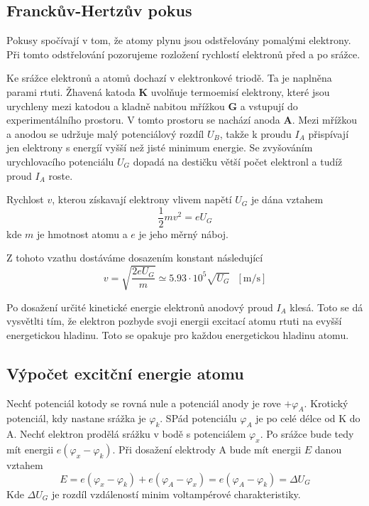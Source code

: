 \documentclass[titlepage]{article}
\begin{document}
\subsection{Franckův-Hertzův pokus}
Pokusy spočívají v tom, že atomy plynu jsou odstřelovány pomalými elektrony. Při tomto odstřelování pozorujeme rozložení rychlostí elektronů před a po srážce.

Ke srážce elektronů a atomů dochazí v elektronkové triodě. Ta je naplněna parami rtuti. Žhavená katoda \textbf{K} uvolňuje termoemisí elektrony, které jsou urychleny mezi katodou a kladně nabitou mřížkou \textbf{G} a vstupují do experimentálního prostoru. V tomto prostoru se nachází anoda \textbf{A}. Mezi mřížkou a anodou se udržuje malý potenciálový rozdíl $U_B$, takže k proudu $I_A$ přispívají jen elektrony s energíí vyšší než jisté minimum energie. Se zvyšováním urychlovacího potenciálu $U_G$ dopadá na destičku větší počet elektronl a tudíž proud $I_A$ roste.

Rychlost $v$, kterou získavají elektrony vlivem napětí $U_G$ je dána vztahem
\begin{equation}
 \frac{1}{2} m v^2 = e U_G
\end{equation}
kde $m$ je hmotnost atomu a $e$ je jeho měrný náboj.

Z tohoto vzathu dostáváme dosazením konstant následující
\begin{equation}
 v = \sqrt{\frac{2 e U_G}{m}} \simeq 5.93 \cdot 10^5 \sqrt{U_G}\ \ \ [\si{\meter \per \second}]
\end{equation}

Po dosažení určité kinetické energie elektronů anodový proud $I_A$ klesá. Toto se dá vysvětlti tím, že elektron pozbyde svoji energii excitací atomu rtuti na evyšší energetickou hladinu. Toto se opakuje pro každou energetickou hladinu atomu.

\subsection{Výpočet excitční energie atomu}
Nechť potenciál kotody se rovná nule a potenciál anody je rove $+ \varphi_A$. Krotický potenciál, kdy nastane srážka je $\varphi_k$. SPád potenciálu $\varphi_A$ je po celé délce od K do A. Nechť elektron prodělá srážku v bodě s potenciálem $\varphi_x$. Po srážce bude tedy mít energii $e(\varphi_x - \varphi_k)$. Při dosažení elektrody A bude mít energii $E$ danou vztahem
\begin{equation}\label{eq:energy}
 E = e(\varphi_x - \varphi_k) + e(\varphi_A - \varphi_x) = e(\varphi_A - \varphi_k) = \Delta U_G
\end{equation}
Kde $\Delta U_G$ je rozdíl vzdáleností minim voltampérové charakteristiky.
\end{document}

